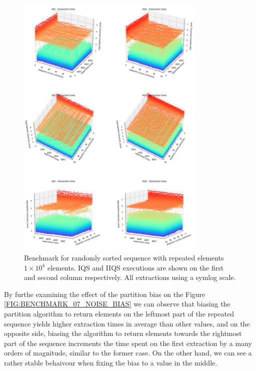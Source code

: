 \begin{figure}[!ht]
    \centering
    \includegraphics[width=0.8\textwidth]{./fragments/04_experimental_execution/images/01_basebenchmark_08_extraction_bias.png}
    \caption{Benchmark for randomly sorted sequence with repeated elements $1\times10^4$ elements. IQS and IIQS executions are shown on the first and second column respectively. All extractions using a symlog scale.}
    \label{FIG:BENCHMARK_08_NOISE_BIAS}
\end{figure}

By furthe examining the effect of the partition bias on the Figure \ref{FIG:BENCHMARK_07_NOISE_BIAS} we can observe that biasing the partition algorithm to return elements on the leftmost part of the repeated sequence yields higher extraction times in average than other values, and on the opposite side, biasing the algorithm to return elements towards the rightmost part of the sequence increments the time spent on the first extraction by a many orders of magnitude, similar to the former case. On the other hand, we can see a rather stable behaivour when fixing the bias to a value in the middle.

